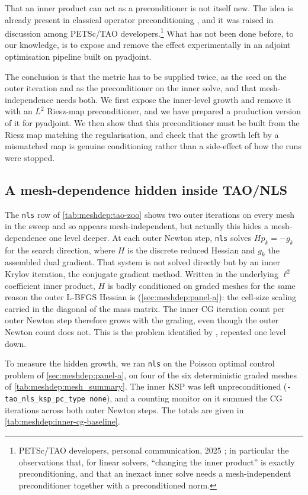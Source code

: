 \documentclass[a4paper,11pt]{article}
\theoremstyle{spacedplain} \newtheorem{theorem}[counter]{Theorem} \newtheorem{lemma}[counter]{Lemma} \newtheorem{prop}[counter]{Proposition} \newtheorem{cor}[counter]{Corollary}
\theoremstyle{spaceddefinition} \newtheorem{defn}[counter]{Definition} \newtheorem{example}[counter]{Example} \newtheorem{remark}[counter]{Remark}
\begin{document}
That an inner product can act as a preconditioner is not itself new. The idea is already present in classical operator preconditioning \citep{kirby2010, mardal2011}, and it was raised in discussion among PETSc/TAO developers.\footnote{PETSc/TAO developers, personal communication, 2025 \citep{petsctao_discord2025}; in particular the observations that, for linear solvers, ``changing the inner product'' is exactly preconditioning, and that an inexact inner solve needs a mesh-independent preconditioner together with a preconditioned norm.} What has not been done before, to our knowledge, is to expose and remove the effect experimentally in an adjoint optimisation pipeline built on pyadjoint.

The conclusion is that the metric has to be supplied twice, as the seed on the outer iteration and as the preconditioner on the inner solve, and that mesh-independence needs both. We first expose the inner-level growth and remove it with an $L^{2}$ Riesz-map preconditioner, and we have prepared a production version of it for pyadjoint. We then show that this preconditioner must be built from the Riesz map matching the regularisation, and check that the growth left by a mismatched map is genuine conditioning rather than a side-effect of how the runs were stopped.

\subsection{A mesh-dependence hidden inside TAO/NLS}
\label{sec:precond:hidden}
The \texttt{nls} row of \cref{tab:meshdep:tao-zoo} shows two outer iterations on every mesh in the sweep and so appears mesh-independent, but actually this hides a mesh-dependence one level deeper. At each outer Newton step, \texttt{nls} solves $H p_{k} = -g_{k}$ for the search direction, where $H$ is the discrete reduced Hessian and $g_{k}$ the assembled dual gradient. That system is not solved directly but by an inner Krylov iteration, the conjugate gradient method. Written in the underlying $\ell^{2}$ coefficient inner product, $H$ is badly conditioned on graded meshes for the same reason the outer L-BFGS Hessian is (\cref{sec:meshdep:panel-a}): the cell-size scaling carried in the diagonal of the mass matrix. The inner CG iteration count per outer Newton step therefore grows with the grading, even though the outer Newton count does not. This is the problem identified by \citet{shfp2017}, repeated one level down.

To measure the hidden growth, we ran \texttt{nls} on the Poisson optimal control problem of \cref{sec:meshdep:panel-a}, on four of the six deterministic graded meshes of \cref{tab:meshdep:mesh_summary}. The inner KSP was left unpreconditioned (\texttt{-tao\_nls\_ksp\_pc\_type none}), and a counting monitor on it summed the CG iterations across both outer Newton steps. The totals are given in \cref{tab:meshdep:inner-cg-baseline}.
\end{document}
